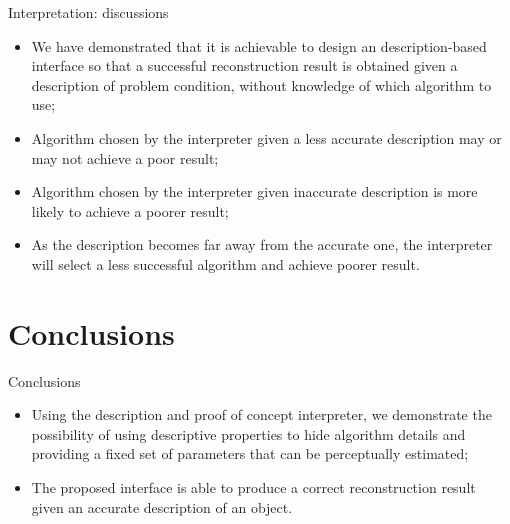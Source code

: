 \documentclass[10pt]{beamer}
\begin{document}
\begin{frame}{Interpretation: discussions}

\begin{exampleblock}{}
\begin{itemize}
\item We have demonstrated that it is achievable to design an description-based interface so that a successful reconstruction result is obtained given a description of problem condition, without knowledge of which algorithm to use;
\item Algorithm chosen by the interpreter given a less accurate description may or may not achieve a poor result;
\item Algorithm chosen by the interpreter given inaccurate description is more likely to achieve a poorer result;
\item As the description becomes far away from the accurate one, the interpreter will select a less successful algorithm and achieve poorer result.
\end{itemize}
\end{exampleblock}

\end{frame}

\section{Conclusions}
\begin{frame}{Conclusions}

\begin{exampleblock}{}

\begin{itemize}
\item Using the description and proof of concept interpreter, we demonstrate the possibility of using descriptive properties to hide algorithm details and providing a fixed set of parameters that can be perceptually estimated;
\item The proposed interface is able to produce a correct reconstruction result given an accurate description of an object.
\end{itemize}

\end{exampleblock}

\end{frame}
\end{document}
